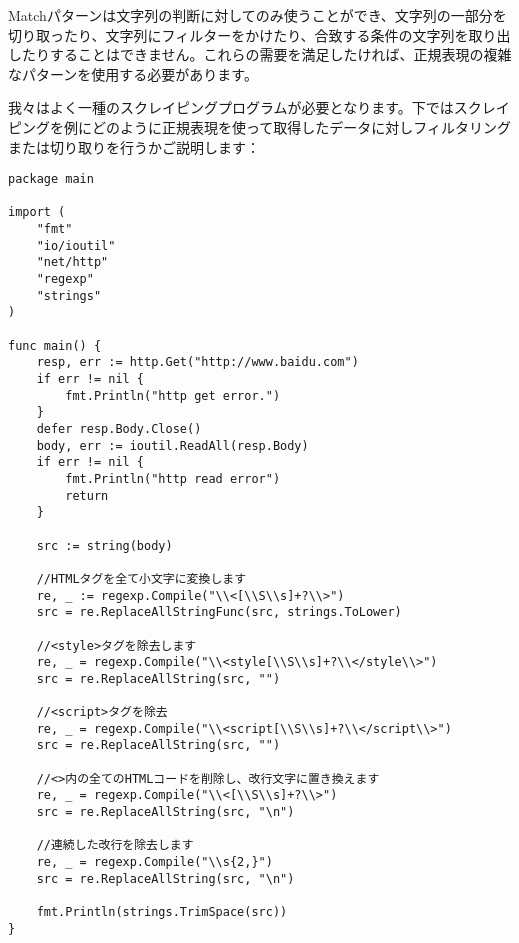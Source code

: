 Matchパターンは文字列の判断に対してのみ使うことができ、文字列の一部分を切り取ったり、文字列にフィルターをかけたり、合致する条件の文字列を取り出したりすることはできません。これらの需要を満足したければ、正規表現の複雑なパターンを使用する必要があります。

我々はよく一種のスクレイピングプログラムが必要となります。下ではスクレイピングを例にどのように正規表現を使って取得したデータに対しフィルタリングまたは切り取りを行うかご説明します：

\begin{lstlisting}[numbers=none]
package main

import (
    "fmt"
    "io/ioutil"
    "net/http"
    "regexp"
    "strings"
)

func main() {
    resp, err := http.Get("http://www.baidu.com")
    if err != nil {
        fmt.Println("http get error.")
    }
    defer resp.Body.Close()
    body, err := ioutil.ReadAll(resp.Body)
    if err != nil {
        fmt.Println("http read error")
        return
    }

    src := string(body)

    //HTMLタグを全て小文字に変換します
    re, _ := regexp.Compile("\\<[\\S\\s]+?\\>")
    src = re.ReplaceAllStringFunc(src, strings.ToLower)

    //<style>タグを除去します
    re, _ = regexp.Compile("\\<style[\\S\\s]+?\\</style\\>")
    src = re.ReplaceAllString(src, "")

    //<script>タグを除去
    re, _ = regexp.Compile("\\<script[\\S\\s]+?\\</script\\>")
    src = re.ReplaceAllString(src, "")

    //<>内の全てのHTMLコードを削除し、改行文字に置き換えます
    re, _ = regexp.Compile("\\<[\\S\\s]+?\\>")
    src = re.ReplaceAllString(src, "\n")

    //連続した改行を除去します
    re, _ = regexp.Compile("\\s{2,}")
    src = re.ReplaceAllString(src, "\n")

    fmt.Println(strings.TrimSpace(src))
}
\end{lstlisting}

